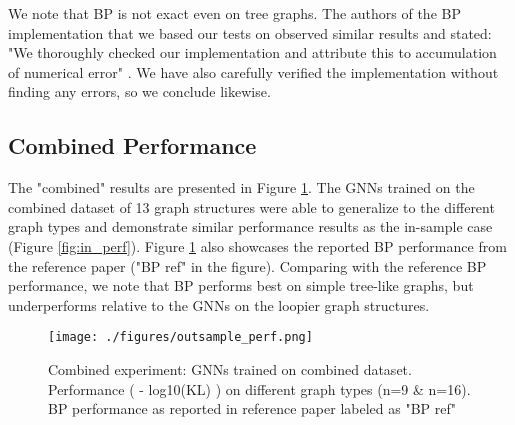 \documentclass{article}
\begin{document}
We note that BP is not exact even on tree graphs. The authors of the BP implementation that we based our tests on observed similar results and stated: "We thoroughly checked our implementation and attribute this to accumulation of numerical error" \cite{pgm_gnn_code}. We have also carefully verified the implementation without finding any errors, so we conclude likewise.

\subsection{Combined Performance}

The "combined" results are presented in Figure \ref{fig:out_perf}. The GNNs trained on the combined dataset of 13 graph structures were able to generalize to the different graph types and demonstrate similar performance results as the in-sample case (Figure \ref{fig:in_perf}). Figure \ref{fig:out_perf} also showcases the reported BP performance from the reference paper \cite{inf_pgm_gnn} ("BP ref" in the figure). Comparing with the reference BP performance, we note that BP performs best on simple tree-like graphs, but underperforms relative to the GNNs on the loopier graph structures. 

\begin{figure}[ht]
    \centering
    \texttt{[image: ./figures/outsample\_perf.png]}
    \caption{Combined experiment: GNNs trained on combined dataset. Performance ( - log10(KL) ) on different graph types (n=9 \& n=16). BP performance as reported in reference paper labeled as "BP ref"}
    \label{fig:out_perf}
\end{figure}


\end{document}
